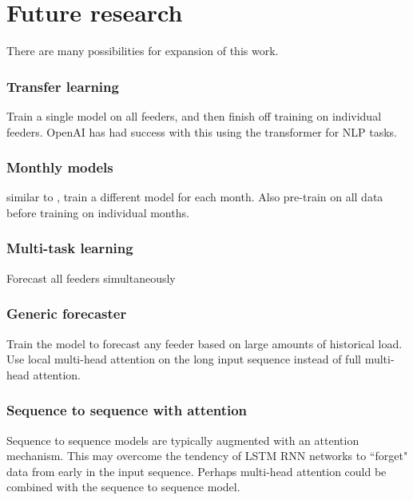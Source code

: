 \section{Future research}
There are many possibilities for expansion of this work.

\subsubsection{Transfer learning}
Train a single model on all feeders, and then finish off training on individual feeders.
OpenAI has had success with this using the transformer for NLP tasks.

\subsubsection{Monthly models}
similar to \citet{Ceperic2013}, train a different model for each month.
Also pre-train on all data before training on individual months.

\subsubsection{Multi-task learning}
Forecast all feeders simultaneously

\subsubsection{Generic forecaster}
Train the model to forecast any feeder based on large amounts of historical load.
Use local multi-head attention on the long input sequence instead of full multi-head attention.

\subsubsection{Sequence to sequence with attention}
Sequence to sequence models are typically augmented with an attention mechanism.
This may overcome the tendency of LSTM RNN networks to ``forget" data from early in the input sequence.
Perhaps multi-head attention could be combined with the sequence to sequence model.